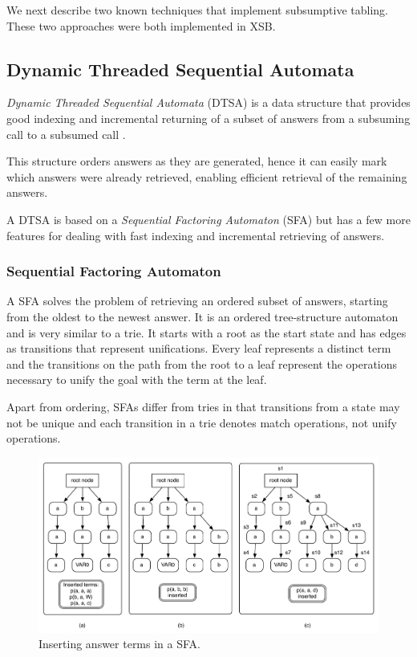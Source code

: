 We next describe two known techniques that implement subsumptive tabling. These two approaches were both implemented in XSB.

\subsection{Dynamic Threaded Sequential Automata}\label{sec:dtsa}

\textit{Dynamic Threaded Sequential Automata} (DTSA) is a data structure that provides good indexing and incremental
returning of a subset of answers from a subsuming call to a subsumed call \cite{Rao-96}.

This structure orders answers as they are generated, hence it can easily mark which answers were already retrieved, enabling
efficient retrieval of the remaining answers.

A DTSA is based on a \textit{Sequential Factoring Automaton} (SFA) \cite{Dawnson-95} but has a few more features for dealing with fast indexing
and incremental retrieving of answers.

\subsubsection{Sequential Factoring Automaton}

A SFA solves the problem of retrieving an ordered subset of answers, starting from the oldest to the newest answer. It is an ordered
tree-structure automaton and is very similar to a trie. It starts with a root as the start state and has edges as transitions
that represent unifications. Every leaf represents a distinct term and the transitions on the path from the root to a leaf
represent the operations necessary to unify the goal with the term at the leaf.

Apart from ordering, SFAs differ from tries in that transitions from a state may not be unique and each transition in a trie
denotes match operations, not unify operations.

\begin{figure}[ht]
  \centering
    \includegraphics[scale=0.6]{sfa.pdf}
  \caption{Inserting answer terms in a SFA.}
  \label{fig:sfa_example}
\end{figure}

